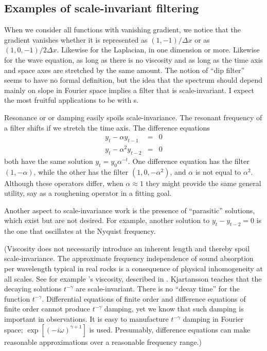\subsection{Examples of scale-invariant filtering}
When we consider all functions with vanishing gradient,
we notice that the gradient vanishes whether it is represented as
$(1,-1)/\Delta x$ or as
$(1,0,-1)/2\Delta x$.
Likewise for the Laplacian, in one dimension or more.
Likewise for the wave equation, as long as there is no viscosity
and as long as the time axis and space axes are stretched
by the same amount.
The notion of ``dip filter'' seems to have no formal definition,
but the idea that the spectrum should depend mainly on slope
in Fourier space implies a filter that is scale-invariant.
I expect
the most fruitful applications
to be with s.

\par
Resonance or  or damping easily spoils scale-invariance.
The resonant frequency of a filter shifts if we stretch the time axis.
The difference equations
\begin{eqnarray}
y_t - \alpha   y_{t-1} &=& 0  \label{eqn:sparsedecay1} \\
y_t - \alpha^2 y_{t-2} &=& 0  \label{eqn:sparsedecay}
\end{eqnarray}
both have the same solution $y_t = y_0 \alpha^{-t}$.
One difference equation has the filter
$(1,-\alpha)$,
while the other has the filter
$(1,0,-\alpha^2)$,
and $\alpha$ is not equal to $\alpha^2$.
Although these operators differ,
when $\alpha \approx 1$ they might provide the same general utility,
say as a roughening operator in a fitting goal.

\par
Another aspect to scale-invariance work is the presence
of ``parasitic'' solutions,
which exist but are not desired.
For example, another solution to $y_t -  y_{t-2}=0$
is the one that oscillates at the Nyquist frequency.

\par
(Viscosity does not necessarily introduce an inherent length
and thereby spoil scale-invariance.
The approximate frequency independence of sound absorption per wavelength
typical in real rocks is a consequence
of physical inhomogeneity at all scales.
See for example 's  viscosity,
described in .
Kjartansson teaches that
the decaying solutions $t^{-\gamma}$ are scale-invariant.
There is no ``decay time'' for the function $t^{-\gamma}$.
Differential equations of finite order and
difference equations of finite order cannot produce
$t^{-\gamma}$ damping,
yet we know that such damping is important in observations.
It is easy to manufacture
$t^{-\gamma}$ damping
in Fourier space;
$\exp[(-i\omega)^{\gamma+1}]$ is used.
Presumably,
difference equations can make reasonable approximations
over a reasonable frequency range.)

